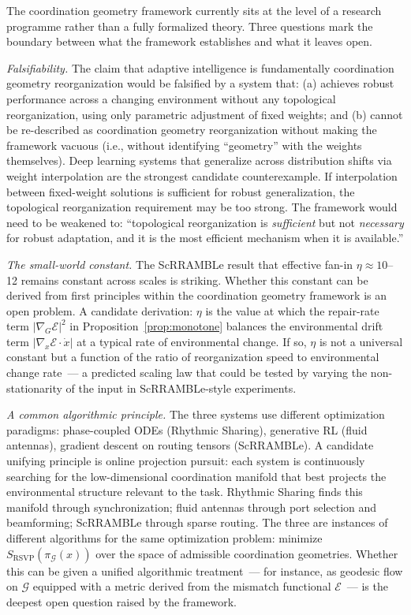 \documentclass[11pt, a4paper]{article}
\theoremstyle{definition}
\theoremstyle{remark}
\begin{document}
The coordination geometry framework currently sits at the level of a research
programme rather than a fully formalized theory. Three questions mark the
boundary between what the framework establishes and what it leaves open.

\textit{Falsifiability.} The claim that adaptive intelligence is
fundamentally coordination geometry reorganization would be falsified by
a system that: (a) achieves robust performance across a changing environment
without any topological reorganization, using only parametric adjustment of
fixed weights; and (b) cannot be re-described as coordination geometry
reorganization without making the framework vacuous (i.e., without
identifying ``geometry'' with the weights themselves). Deep learning systems
that generalize across distribution shifts via weight interpolation are the
strongest candidate counterexample. If interpolation between fixed-weight
solutions is sufficient for robust generalization, the topological
reorganization requirement may be too strong. The framework would need to
be weakened to: ``topological reorganization is \emph{sufficient} but not
\emph{necessary} for robust adaptation, and it is the most efficient mechanism
when it is available.''

\textit{The small-world constant.} The ScRRAMBLe result that effective fan-in
$\eta \approx 10$--12 remains constant across scales is striking. Whether
this constant can be derived from first principles within the coordination
geometry framework is an open problem. A candidate derivation: $\eta$ is the
value at which the repair-rate term $|\nabla_G \mathcal{E}|^2$ in
Proposition~\ref{prop:monotone} balances the environmental drift term
$|\nabla_x \mathcal{E} \cdot \dot{x}|$ at a typical rate of environmental
change. If so, $\eta$ is not a universal constant but a function of the
ratio of reorganization speed to environmental change rate~--- a predicted
scaling law that could be tested by varying the non-stationarity of the
input in ScRRAMBLe-style experiments.

\textit{A common algorithmic principle.} The three systems use different
optimization paradigms: phase-coupled ODEs (Rhythmic Sharing), generative
RL (fluid antennas), gradient descent on routing tensors (ScRRAMBLe). A
candidate unifying principle is online projection pursuit: each system is
continuously searching for the low-dimensional coordination manifold that
best projects the environmental structure relevant to the task.
Rhythmic Sharing finds this manifold through synchronization; fluid antennas
through port selection and beamforming; ScRRAMBLe through sparse routing.
The three are instances of different algorithms for the same optimization
problem: minimize $S_{\mathrm{RSVP}}(\pi_{\mathcal{G}}(x))$ over the
space of admissible coordination geometries. Whether this can be given a
unified algorithmic treatment~--- for instance, as geodesic flow on
$\mathcal{G}$ equipped with a metric derived from the mismatch functional
$\mathcal{E}$~--- is the deepest open question raised by the framework.
\end{document}
